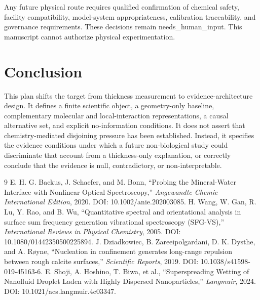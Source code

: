 \documentclass[11pt]{article}
\begin{document}
Any future physical route requires qualified confirmation of chemical safety, facility compatibility, model-system appropriateness, calibration traceability, and governance requirements. These decisions remain needs\_human\_input. This manuscript cannot authorize physical experimentation.

\section{Conclusion}
This plan shifts the target from thickness measurement to evidence-architecture design. It defines a finite scientific object, a geometry-only baseline, complementary molecular and local-interaction representations, a causal alternative set, and explicit no-information conditions. It does not assert that chemistry-mediated disjoining pressure has been established. Instead, it specifies the evidence conditions under which a future non-biological study could discriminate that account from a thickness-only explanation, or correctly conclude that the evidence is null, contradictory, or non-interpretable.

\begin{thebibliography}{9}
 E. H. G. Backus, J. Schaefer, and M. Bonn, ``Probing the Mineral-Water Interface with Nonlinear Optical Spectroscopy,'' \textit{Angewandte Chemie International Edition}, 2020. DOI: 10.1002/anie.202003085.
 H. Wang, W. Gan, R. Lu, Y. Rao, and B. Wu, ``Quantitative spectral and orientational analysis in surface sum frequency generation vibrational spectroscopy (SFG-VS),'' \textit{International Reviews in Physical Chemistry}, 2005. DOI: 10.1080/01442350500225894.
 J. Dziadkowiec, B. Zareeipolgardani, D. K. Dysthe, and A. Røyne, ``Nucleation in confinement generates long-range repulsion between rough calcite surfaces,'' \textit{Scientific Reports}, 2019. DOI: 10.1038/s41598-019-45163-6.
 E. Shoji, A. Hoshino, T. Biwa, et al., ``Superspreading Wetting of Nanofluid Droplet Laden with Highly Dispersed Nanoparticles,'' \textit{Langmuir}, 2024. DOI: 10.1021/acs.langmuir.4c03347.
\end{thebibliography}
\end{document}
